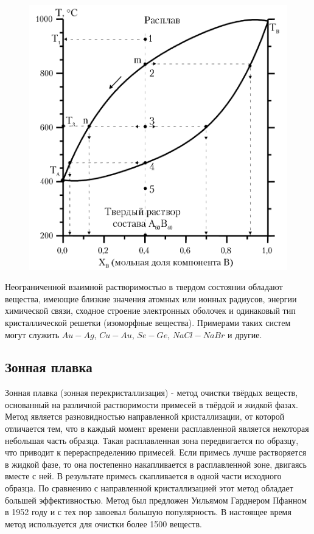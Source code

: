 \documentclass[14pt,a4paper]{scrartcl}
\begin{document}
\begin{figure}[H]
\centering
\includegraphics[scale=.600]{cristallization-diagram2.png}
\caption{}
\label{}
\end{figure}

Неограниченной взаимной растворимостью в твердом состоянии обладают вещества, имеющие близкие значения атомных или ионных радиусов, энергии химической связи, сходное строение электронных оболочек и одинаковый тип кристаллической решетки (изоморфные вещества). Примерами таких систем могут служить $Au-Ag$, $Cu-Au$, $Se-Ge$, $NaCl-NaBr$ и другие.

\subsection*{Зонная плавка}

Зонная плавка (зонная перекристаллизация) - метод очистки твёрдых веществ, основанный на различной растворимости примесей в твёрдой и жидкой фазах. Метод является разновидностью направленной кристаллизации, от которой отличается тем, что в каждый момент времени расплавленной является некоторая небольшая часть образца. Такая расплавленная зона передвигается по образцу, что приводит к перераспределению примесей. Если примесь лучше растворяется в жидкой фазе, то она постепенно накапливается в расплавленной зоне, двигаясь вместе с ней. В результате примесь скапливается в одной части исходного образца. По сравнению с направленной кристаллизацией этот метод обладает большей эффективностью. Метод был предложен Уильямом Гарднером Пфанном в 1952 году и с тех пор завоевал большую популярность. В настоящее время метод используется для очистки более 1500 веществ.
\end{document}
